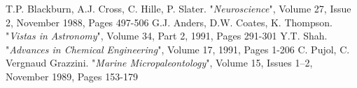 \documentclass[a4paper,10.5pt]{article}
\title{}
\author{}
\date{}
\begin{document}
	
\begin{thebibliography}{9}

T.P. Blackburn, A.J. Cross, C. Hille, P. Slater. "\emph{Neuroscience}", Volume 27, Issue 2, November 1988, Pages 497-506
G.J. Anders, D.W. Coates, K. Thompson. "\emph{Vistas in Astronomy}", Volume 34, Part 2, 1991, Pages 291-301
Y.T. Shah. "\emph{Advances in Chemical Engineering}", Volume 17, 1991, Pages 1-206
C. Pujol, C. Vergnaud Grazzini. "\emph{Marine Micropaleontology}", Volume 15, Issues 1–2, November 1989, Pages 153-179
\end{thebibliography}
\end{document}
